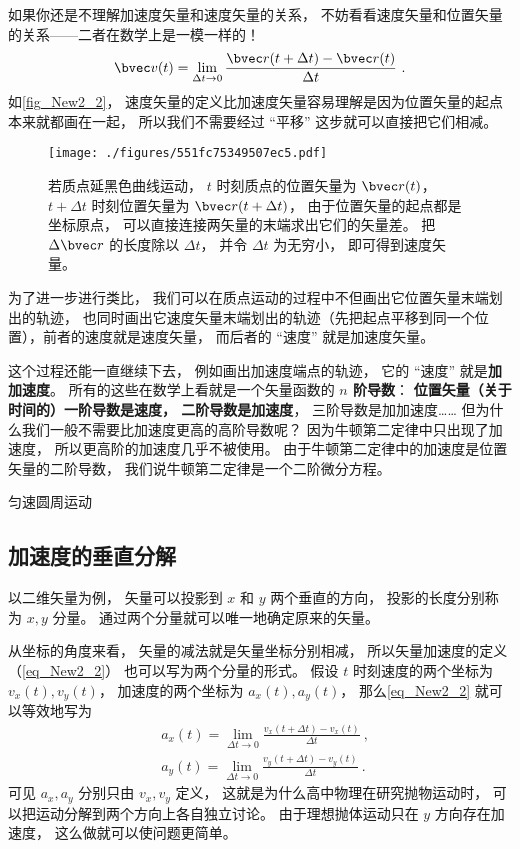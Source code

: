 如果你还是不理解加速度矢量和速度矢量的关系， 不妨看看速度矢量和位置矢量的关系——二者在数学上是一模一样的！
\begin{equation}
\bvec v(t) = \lim_{\Delta t\to 0}\frac{\bvec r(t+\Delta t) - \bvec r(t)}{\Delta t}~.
\end{equation}
如\autoref{fig_New2_2}， 速度矢量的定义比加速度矢量容易理解是因为位置矢量的起点本来就都画在一起， 所以我们不需要经过 “平移” 这步就可以直接把它们相减。
\begin{figure}[ht]
\centering
\texttt{[image: ./figures/551fc75349507ec5.pdf]}
\caption{若质点延黑色曲线运动， $t$ 时刻质点的位置矢量为 $\bvec r(t)$，$t+\Delta t$ 时刻位置矢量为 $\bvec r(t+\Delta t)$， 由于位置矢量的起点都是坐标原点， 可以直接连接两矢量的末端求出它们的矢量差。 把 $\Delta \bvec r$ 的长度除以 $\Delta t$， 并令 $\Delta t$ 为无穷小， 即可得到速度矢量。} \label{fig_New2_2}
\end{figure}

为了进一步进行类比， 我们可以在质点运动的过程中不但画出它位置矢量末端划出的轨迹， 也同时画出它速度矢量末端划出的轨迹（先把起点平移到同一个位置），前者的速度就是速度矢量， 而后者的 “速度” 就是加速度矢量。

这个过程还能一直继续下去， 例如画出加速度端点的轨迹， 它的 “速度” 就是\textbf{加加速度}。 所有的这些在数学上看就是一个矢量函数的\textbf{ $n$ 阶导数}： \textbf{位置矢量（关于时间的）一阶导数是速度， 二阶导数是加速度}， 三阶导数是加加速度…… 但为什么我们一般不需要比加速度更高的高阶导数呢？ 因为牛顿第二定律中只出现了加速度， 所以更高阶的加速度几乎不被使用。 由于牛顿第二定律中的加速度是位置矢量的二阶导数， 我们说牛顿第二定律是一个二阶微分方程。

\begin{example}{匀速圆周运动}
\end{example}

\subsection{加速度的垂直分解}

以二维矢量为例， 矢量可以投影到 $x$ 和 $y$ 两个垂直的方向， 投影的长度分别称为 $x, y$ 分量。 通过两个分量就可以唯一地确定原来的矢量。

从坐标的角度来看， 矢量的减法就是矢量坐标分别相减， 所以矢量加速度的定义（\autoref{eq_New2_2}） 也可以写为两个分量的形式。 假设 $t$ 时刻速度的两个坐标为 $v_x(t), v_y(t)$， 加速度的两个坐标为 $a_x(t), a_y(t)$， 那么\autoref{eq_New2_2} 就可以等效地写为
\begin{equation}
\begin{aligned}
&a_x(t) = \lim_{\Delta t\to 0}\frac{v_x(t+\Delta t) - v_x(t)}{\Delta t}~,\\
&a_y(t) = \lim_{\Delta t\to 0}\frac{v_y(t+\Delta t) - v_y(t)}{\Delta t}~.
\end{aligned}
\end{equation}
可见 $a_x,a_y$ 分别只由 $v_x,v_y$ 定义， 这就是为什么高中物理在研究抛物运动时， 可以把运动分解到两个方向上各自独立讨论。 由于理想抛体运动只在 $y$ 方向存在加速度， 这么做就可以使问题更简单。

